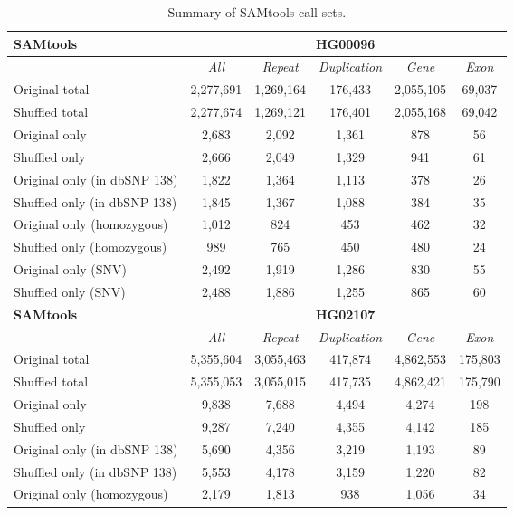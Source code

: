 \begin{table}[htb]
\caption{ Summary of SAMtools call sets. }
\begin{center}
\begin{tabular}{|l|c||c|c|c|c|}
\hline
{\bf SAMtools} & \multicolumn{5}{|c|}{\bf HG00096} \\
\hline
\cline{2-6}
{\bf} & {\it All} & {\it Repeat} & {\it Duplication} & {\it Gene} & {\it Exon} \\
\hline
Original total & 2,277,691 & 1,269,164 & 176,433 & 2,055,105 & 69,037 \\
\hline
Shuffled total & 2,277,674 & 1,269,121 & 176,401 & 2,055,168 & 69,042 \\
\hline
Original only & 2,683 & 2,092 & 1,361 & 878 & 56 \\
\hline
Shuffled only & 2,666 & 2,049 & 1,329 & 941 & 61 \\
\hline
Original only (in dbSNP 138) & 1,822 & 1,364 & 1,113 & 378 & 26 \\
\hline
Shuffled only (in dbSNP 138) & 1,845 & 1,367 & 1,088 & 384 & 35 \\
\hline
Original only (homozygous) & 1,012 & 824 & 453 & 462 & 32 \\
\hline
Shuffled only (homozygous) & 989 & 765 & 450 & 480 & 24 \\
\hline
Original only (SNV) & 2,492 & 1,919 & 1,286 & 830 & 55 \\
\hline
Shuffled only (SNV) & 2,488 & 1,886 & 1,255 & 865 & 60 \\ 
\hline
\hline
{\bf SAMtools} & \multicolumn{5}{|c|}{\bf HG02107} \\
\hline
\cline{2-6}
{\bf} & {\it All} & {\it Repeat} & {\it Duplication} & {\it Gene} & {\it Exon} \\
\hline
Original total & 5,355,604 & 3,055,463 & 417,874 & 4,862,553 & 175,803 \\
\hline
Shuffled total & 5,355,053 & 3,055,015 & 417,735 & 4,862,421 & 175,790 \\
\hline
Original only & 9,838 & 7,688 & 4,494 & 4,274 & 198 \\
\hline
Shuffled only & 9,287 & 7,240 & 4,355 & 4,142 & 185 \\
\hline
Original only (in dbSNP 138) & 5,690 & 4,356 & 3,219 & 1,193 & 89 \\
\hline
Shuffled only (in dbSNP 138) & 5,553 & 4,178 & 3,159 & 1,220 & 82 \\
\hline
Original only (homozygous) & 2,179 & 1,813 & 938 & 1,056 & 34 \\

\end{tabular}
\end{center}
\end{table}
